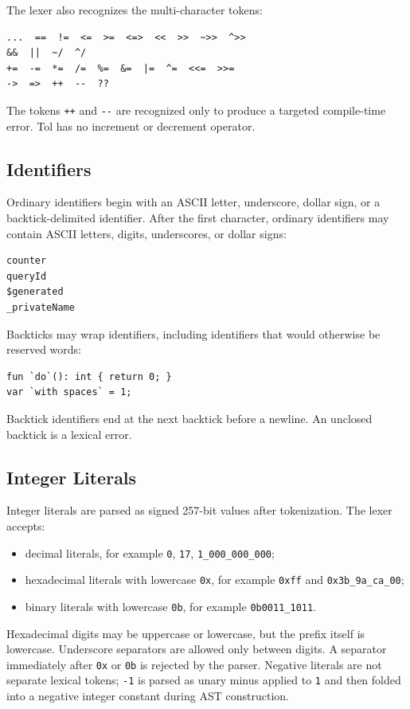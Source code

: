 \documentclass[12pt,oneside]{article}
\begin{document}
The lexer also recognizes the multi-character tokens:

\begin{verbatim}
...  ==  !=  <=  >=  <=>  <<  >>  ~>>  ^>>
&&  ||  ~/  ^/
+=  -=  *=  /=  %=  &=  |=  ^=  <<=  >>=
->  =>  ++  --  ??
\end{verbatim}

The tokens \verb|++| and \verb|--| are recognized only to produce a targeted
compile-time error. Tol has no increment or decrement operator.

\subsection{Identifiers}
Ordinary identifiers begin with an ASCII letter, underscore, dollar sign, or a
backtick-delimited identifier. After the first character, ordinary identifiers
may contain ASCII letters, digits, underscores, or dollar signs:

\begin{verbatim}
counter
queryId
$generated
_privateName
\end{verbatim}

Backticks may wrap identifiers, including identifiers that would otherwise be
reserved words:

\begin{verbatim}
fun `do`(): int { return 0; }
var `with spaces` = 1;
\end{verbatim}

Backtick identifiers end at the next backtick before a newline. An unclosed
backtick is a lexical error.

\subsection{Integer Literals}
Integer literals are parsed as signed 257-bit values after tokenization. The
lexer accepts:

\begin{itemize}
\item decimal literals, for example \verb|0|, \verb|17|, \verb|1_000_000_000|;
\item hexadecimal literals with lowercase \verb|0x|, for example
\verb|0xff| and \verb|0x3b_9a_ca_00|;
\item binary literals with lowercase \verb|0b|, for example
\verb|0b0011_1011|.
\end{itemize}

Hexadecimal digits may be uppercase or lowercase, but the prefix itself is
lowercase. Underscore separators are allowed only between digits. A separator
immediately after \verb|0x| or \verb|0b| is rejected by the parser. Negative
literals are not separate lexical tokens; \verb|-1| is parsed as unary minus
applied to \verb|1| and then folded into a negative integer constant during
AST construction.
\end{document}
